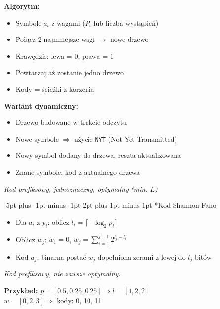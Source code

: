 \documentclass{notatki}
\makeatletter
\renewcommand\section{\@startsection {section}{1}{\z@}%
  {-5pt plus -1pt minus -1pt}%
  {2pt plus 1pt minus 1pt}%
  {\normalfont\large\bfseries}} %
\makeatother
\begin{document}
\begin{multicols}{2}
    \begin{multicols}{2}
    
    \textbf{Algorytm:}
    \begin{itemize}
      \setlength{\itemsep}{1pt}
      \item Symbole $a_i$ z wagami ($P_i$ lub liczba wystąpień)
      \item Połącz 2 najmniejsze wagi $\rightarrow$ nowe drzewo
      \item Krawędzie: lewa = 0, prawa = 1
      \item Powtarzaj aż zostanie jedno drzewo
      \item Kody = ścieżki z korzenia
    \end{itemize}
    
    
    \columnbreak
    
    \textbf{Wariant dynamiczny:}
    \begin{itemize}
      \setlength{\itemsep}{1pt}
      \item Drzewo budowane w trakcie odczytu
      \item Nowe symbole $\Rightarrow$ użycie \texttt{NYT} (Not Yet Transmitted)
      \item Nowy symbol dodany do drzewa, reszta aktualizowana
      \item Znane symbole: kod z aktualnego drzewa
    \end{itemize}
    \textit{Kod prefiksowy, jednoznaczny, optymalny (min. $L$)}
    
    \end{multicols}
    

\vspace{-2em}
  \section*{Kod Shannon-Fano}

  \begin{itemize}
    \item Dla $a_i$ z $p_i$: oblicz $l_i = \lceil -\log_2 p_i \rceil$
    \item Oblicz $w_j$: \quad $w_1 = 0$, \quad $w_j = \sum_{i=1}^{j-1} 2^{l_j - l_i}$
    \item Kod $a_j$: binarna postać $w_j$ dopełniona zerami z lewej do $l_j$ bitów
  \end{itemize}
  
  \textit{Kod prefiksowy, nie zawsze optymalny.}
  
  \textbf{Przykład:} $p = [0.5, 0.25, 0.25] \Rightarrow l = [1, 2, 2]$ \\
  $w = [0, 2, 3] \Rightarrow$ \quad kody: 0, 10, 11


\end{multicols}
\end{document}
